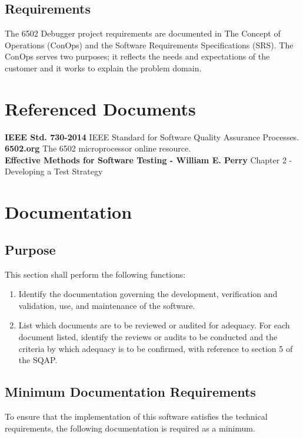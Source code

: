 \documentclass[a3paper, 11pt]{article}
\begin{document}
\subsection{Requirements}
The 6502 Debugger project requirements are documented in The Concept of Operations (ConOps) and the Software Requirements Specifications (SRS). The ConOps serves two purposes; it reflects the needs and expectations of the customer and it works to explain the problem domain.\\
\par


\section{Referenced Documents}
\textbf{IEEE Std. 730-2014}
IEEE Standard for Software Quality Assurance Processes.\\
\textbf{6502.org}
The 6502 microprocessor online resource.\\
\textbf{Effective Methods for Software Testing - William E. Perry}
Chapter 2 - Developing a Test Strategy 
\\
\par


\section{Documentation}
\subsection{Purpose}
This section shall perform the following functions:
\begin{enumerate}
	\setlength\itemsep{-0.25em}
	\item Identify the documentation governing the development, verification and validation, use, and maintenance of the software.
	\item List which documents are to be reviewed or audited for adequacy. For each document listed, identify the reviews or audits to be conducted and the criteria by which adequacy is to be confirmed, with reference to section 5 of the SQAP. 
\end{enumerate}

\subsection{Minimum Documentation Requirements}
To ensure that the implementation of this software satisfies the technical requirements, the following documentation is required as a minimum. 
\end{document}
